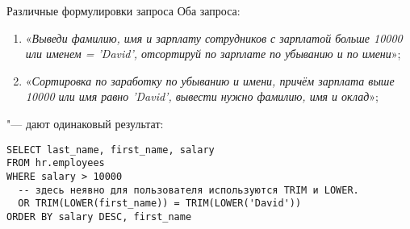 \begin{frame}[fragile]{Различные формулировки запроса}%
  Оба запроса:
  \begin{enumerate}%
    \item «\textit{Выведи фамилию, имя и зарплату сотрудников с зарплатой больше 10000 или именем = 'David', отсортируй по зарплате по убыванию и по имени}»;
    \item «\textit{Сортировка по заработку по убыванию и имени, причём зарплата выше 10000 или имя равно 'David', вывести нужно фамилию, имя и оклад}»;
  \end{enumerate}
  "--- дают одинаковый результат:

  \begin{verbatim}
SELECT last_name, first_name, salary
FROM hr.employees
WHERE salary > 10000
  -- здесь неявно для пользователя используются TRIM и LOWER.
  OR TRIM(LOWER(first_name)) = TRIM(LOWER('David'))
ORDER BY salary DESC, first_name
  \end{verbatim}

\end{frame}
